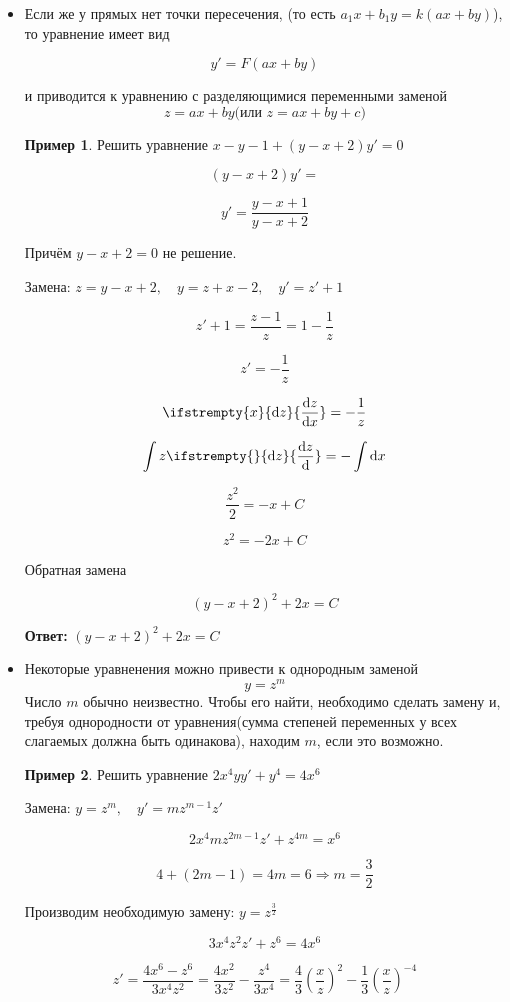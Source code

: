 \documentclass[a4paper, 14pt]{article}
\newcommand{\dx}{\mathrm{d}x}
\newcommand{\dv}[2]{%
  \ifstrempty{#2}%
    {\mathrm{d}#1}%
    {\frac{\mathrm{d}#1}{\mathrm{d}#2}}%
}
\theoremstyle{definition}
\newtheorem*{example}{Пример}
\newenvironment{answer}
  {\par\noindent\textbf{Ответ:}}
  {\par}
\begin{document}
\begin{itemize}
\item \textbf{}Если же у прямых нет точки пересечения, (то есть $a_1x+b_1y = k(ax+by)$), то уравнение имеет вид 
 
 \[y'= F(ax+by)\]
 
 и приводится к уравнению с разделяющимися переменными заменой 
 \[z = ax+by \text{(или } z = ax+by+c\text{)}\]

\begin{example}
    Решить уравнение $x-y-1 +(y-x+2)y'=0$

    \[(y-x+2)y'= \]

    \[y'=\frac{y-x+1}{y-x+2}\]

    Причём $y-x+2=0$ не решение.

    Замена: $z =y -x +2, \quad y = z +x-2, \quad y'= z'+1$

    \[z'+1=\frac{z-1}{z} = 1-\frac{1}{z}\]

    \[z'=-\frac{1}{z}\]

    \[\dv{z}{x}= -\frac{1}{z}\]

    \[\int{z}\dv{z}{} = -\int\dx\]

    \[\frac{z^2}{2} = -x+C\]

    \[z^2 = -2x + C\]

    Обратная замена

    \[(y-x+2)^2 + 2x= C\]
\end{example}
\begin{answer}
    $(y-x+2)^2 + 2x= C$
\end{answer}



\item \textbf{}Некоторые уравненения можно привести к однородным заменой 
\[y = z^m\]
Число $m$ обычно неизвестно. Чтобы его найти, необходимо сделать замену и, требуя однородности от уравнения(сумма степеней переменных у всех слагаемых должна быть одинакова), находим $m$, если это возможно.

\begin{example}
    Решить уравнение $2x^4yy'+y^4=4x^6$

    Замена: $y = z^m, \quad y' = mz^{m-1}z'$

    \[2x^4mz^{2m-1}z' + z^{4m} = x^6\]

    \[4 + (2m-1) = 4m = 6 \Longrightarrow m =\frac{3}{2}\]

    Производим необходимую замену: $y=z^{\frac{3}{2}}$

    \[3x^4z^2z' + z^6 = 4x^6\]

    \[z'=\frac{4x^6-z^6}{3x^4z^2} = \frac{4x^2}{3z^2} -\frac{z^4}{3x^4} = \frac{4}{3}\left(\frac{x}{z}\right)^2-\frac{1}{3}\left(\frac{x}{z}\right)^{-4}\]


\end{example}
\end{itemize}
\end{document}
